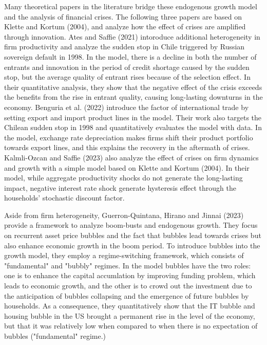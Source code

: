 \documentclass[a4paper,12pt]{article}
\begin{document}
Many theoretical papers in the literature bridge these endogenous growth model and the analysis of financial crises. The following three papers are based on Klette and Kortum (2004), and analyze how the effect of crises are amplified through innovation. Ates and Saffie (2021) intoroduce additional heterogeneity in firm productivity and analyze the sudden stop in Chile triggered by Russian sovereign default in 1998. In the model, there is a decline in both the number of entrants and innovation in the period of credit shortage caused by the sudden stop, but the average quality of entrant rises because of the selection effect. In their quantitative analysis, they show that the negative effect of the crisis exceeds the benefits from the rise in entrant quality, causing long-lasting downturns in the economy. Benguria et al. (2022) introduce the factor of international trade by setting export and import product lines in the model. Their work also targets the Chilean sudden stop in 1998 and quantitatively evaluates the model with data. In the model, exchange rate depreciation makes firms shift their product portfolio towards export lines, and this explains the recovery in the aftermath of crises. Kalmli-Ozcan and Saffie (2023) also analyze the effect of crises on firm dynamics and growth with a simple model based on Klette and Kortum (2004). In their model, while aggregate productivity shocks do not generate the long-lasting impact, negative interest rate shock generate hysteresis effect through the households' stochastic discount factor. \par
Aside from firm heterogeneity, Guerron-Quintana, Hirano and Jinnai (2023) provide a framework to analyze boom-busts and endogenous growth. They focus on recurrent asset price bubbles and the fact that bubbles lead towards crises but also enhance economic growth in the boom period. To introduce bubbles into the growth model, they employ a regime-switching framework, which consists of "fundamental" and "bubbly" regimes. In the model bubbles have the two roles: one is to enhance the capital accumlation by improving funding problem, which leads to economic growth, and the other is to crowd out the investment due to the anticipation of bubbles collapsing and the emergence of future bubbles by households. As a consequence, they quantitatively show that the IT bubble and housing bubble in the US brought a permanent rise in the level of the economy, but that it was relatively low when compared to when there is no expectation of bubbles ("fundamental" regime.) \par
\end{document}
